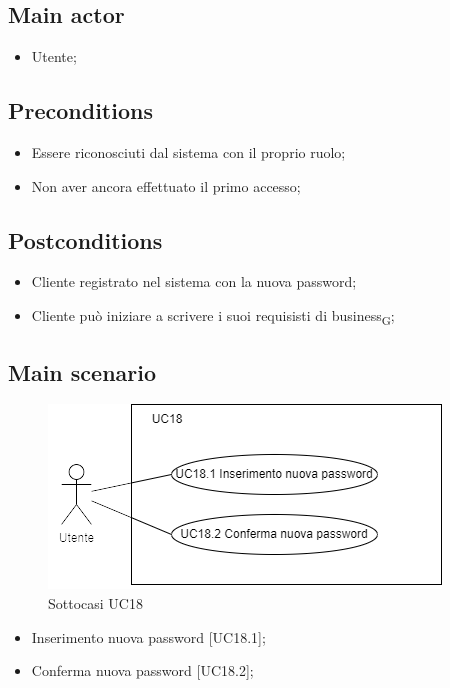 \documentclass{article}
\begin{document}
\subsection*{Main actor}
        \begin{itemize}
            \item Utente;
        \end{itemize}
        
    \subsection*{Preconditions}
        \begin{itemize}
            \item Essere riconosciuti dal sistema con il proprio ruolo;
            \item Non aver ancora effettuato il primo accesso;
        \end{itemize}
        
    \subsection*{Postconditions}
        \begin{itemize}
            \item Cliente registrato nel sistema con la nuova password;
            \item Cliente può iniziare a scrivere i suoi requisisti di business\textsubscript{G};
        \end{itemize}
     \subsection*{Main scenario}
        \begin{figure}[h]
          \centering
          \includegraphics{./imgUML/UC18-zoom.png}
            \caption{Sottocasi UC18}
          \label{fig:UC18_sottocasi}
        \end{figure}
        
        \begin{itemize}
            \item Inserimento nuova password [UC18.1];
            \item Conferma nuova password [UC18.2];
        \end{itemize}
\end{document}
